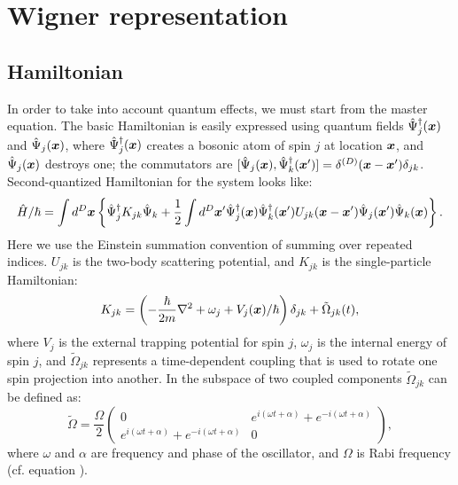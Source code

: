 \chapter{Wigner representation}
\label{cha:wigner}


\section{Hamiltonian}

In order to take into account quantum effects, we must start from the master equation.
The basic Hamiltonian is easily expressed using quantum fields $\hat{\Psi}_j^{\dagger}(\boldsymbol{x})$ and $\hat{\Psi}_j(\boldsymbol{x})$,
where $\hat{\Psi}_j^{\dagger}(\boldsymbol{x})$ creates a bosonic atom of spin $j$ at location $\boldsymbol{x}$,
and $\hat{\Psi}_j(\boldsymbol{x})$ destroys one;
the commutators are $[\hat{\Psi}_j(\boldsymbol{x}),\hat{\Psi}_k^{\dagger}(\boldsymbol{x}^\prime)] =
\delta^{(D)}(\boldsymbol{x}-\boldsymbol{x}^\prime)\delta_{jk}$.
Second-quantized Hamiltonian for the system looks like:
\begin{equation}
\label{eqn:wigner:hamiltonian}
\begin{split}
	\hat{H} / \hbar = \int d^{D}\boldsymbol{x} \left\{
		\hat{\Psi}_j^{\dagger} K_{jk} \hat{\Psi}_k
		+ \frac{1}{2} \int d^D\boldsymbol{x}^\prime
			\hat{\Psi}_j^\dagger (\boldsymbol{x}) \hat{\Psi}_k^\dagger (\boldsymbol{x}^\prime)
			U_{jk}(\boldsymbol{x} - \boldsymbol{x}^\prime)
			\hat{\Psi}_j (\boldsymbol{x}^\prime) \hat{\Psi}_k (\boldsymbol{x})
	\right\}.
\end{split}
\end{equation}
Here we use the Einstein summation convention of summing over repeated indices.
$U_{jk}$ is the two-body scattering potential, and $K_{jk}$ is the single-particle Hamiltonian:
\begin{equation}
	K_{jk} = \left(
			-\frac{\hbar}{2m} \nabla^2 + \omega_j + V_j(\boldsymbol{x}) / \hbar
		\right) \delta_{jk}
		+ \tilde{\Omega}_{jk}(t),
\end{equation}
where $V_j$ is the external trapping potential for spin $j$,
$\omega_j$ is the internal energy of spin $j$,
and $\tilde{\Omega}_{jk}$ represents a time-dependent coupling that is used to rotate one spin projection into another.
In the subspace of two coupled components $\tilde{\Omega}_{jk}$ can be defined as:
\[
	\tilde{\Omega} = \frac{\Omega}{2} \begin{pmatrix}
		0 & e^{i(\omega t + \alpha)} + e^{-i(\omega t + \alpha)} \\
		e^{i (\omega t + \alpha)} + e^{-i(\omega t + \alpha)} & 0
	\end{pmatrix},
\]
where $\omega$ and $\alpha$ are frequency and phase of the oscillator,
and $\Omega$ is Rabi frequency (cf. equation ).

